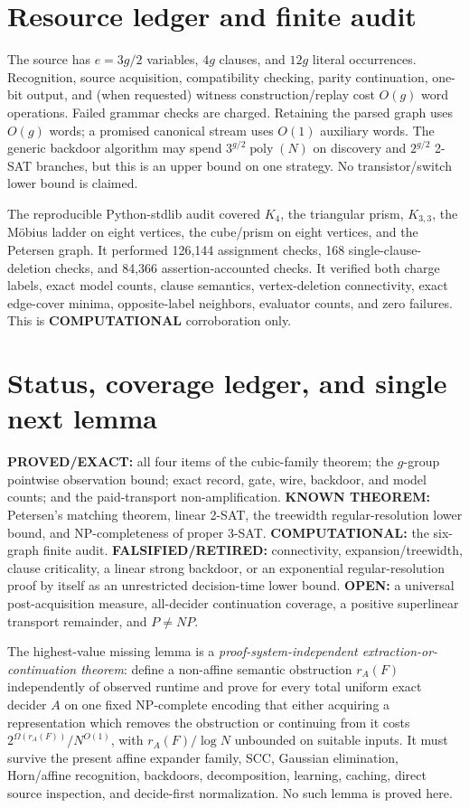 \documentclass[11pt]{article}
\begin{document}
\section{Resource ledger and finite audit}
The source has $e=3g/2$ variables, $4g$ clauses, and $12g$ literal occurrences. Recognition, source acquisition, compatibility checking, parity continuation, one-bit output, and (when requested) witness construction/replay cost $O(g)$ word operations. Failed grammar checks are charged. Retaining the parsed graph uses $O(g)$ words; a promised canonical stream uses $O(1)$ auxiliary words. The generic backdoor algorithm may spend $3^{g/2}\operatorname{poly}(N)$ on discovery and $2^{g/2}$ 2-SAT branches, but this is an upper bound on one strategy. No transistor/switch lower bound is claimed.

The reproducible Python-stdlib audit covered $K_4$, the triangular prism, $K_{3,3}$, the M\"obius ladder on eight vertices, the cube/prism on eight vertices, and the Petersen graph. It performed 126,144 assignment checks, 168 single-clause-deletion checks, and 84,366 assertion-accounted checks. It verified both charge labels, exact model counts, clause semantics, vertex-deletion connectivity, exact edge-cover minima, opposite-label neighbors, evaluator counts, and zero failures. This is \textbf{COMPUTATIONAL} corroboration only.

\section{Status, coverage ledger, and single next lemma}
\textbf{PROVED/EXACT:} all four items of the cubic-family theorem; the $g$-group pointwise observation bound; exact record, gate, wire, backdoor, and model counts; and the paid-transport non-amplification. \textbf{KNOWN THEOREM:} Petersen's matching theorem, linear 2-SAT, the treewidth regular-resolution lower bound, and NP-completeness of proper 3-SAT. \textbf{COMPUTATIONAL:} the six-graph finite audit. \textbf{FALSIFIED/RETIRED:} connectivity, expansion/treewidth, clause criticality, a linear strong backdoor, or an exponential regular-resolution proof by itself as an unrestricted decision-time lower bound. \textbf{OPEN:} a universal post-acquisition measure, all-decider continuation coverage, a positive superlinear transport remainder, and $P\ne NP$.

The highest-value missing lemma is a \emph{proof-system-independent extraction-or-continuation theorem}: define a non-affine semantic obstruction $r_A(F)$ independently of observed runtime and prove for every total uniform exact decider $A$ on one fixed NP-complete encoding that either acquiring a representation which removes the obstruction or continuing from it costs $2^{\Omega(r_A(F))}/N^{O(1)}$, with $r_A(F)/\log N$ unbounded on suitable inputs. It must survive the present affine expander family, SCC, Gaussian elimination, Horn/affine recognition, backdoors, decomposition, learning, caching, direct source inspection, and decide-first normalization. No such lemma is proved here.
\end{document}

